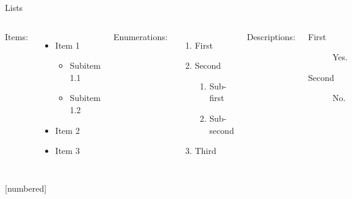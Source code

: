 \documentclass{beamer}
\begin{document}
    \begin{frame}{Lists}
        \begin{columns}[t, onlytextwidth]
                Items:
                \begin{itemize}
                    \item Item 1
                    \begin{itemize}
                        \item Subitem 1.1
                        \item Subitem 1.2
                    \end{itemize}
                    \item Item 2
                    \item Item 3
                \end{itemize}
            
                Enumerations:
                \begin{enumerate}
                    \item First
                    \item Second
                    \begin{enumerate}
                        \item Sub-first
                        \item Sub-second
                    \end{enumerate}
                    \item Third
                \end{enumerate}
            
                Descriptions:
                \begin{description}
                    \item[First] Yes.
                    \item[Second] No.
                \end{description}
        \end{columns}
    \end{frame}
[numbered]
\end{document}
